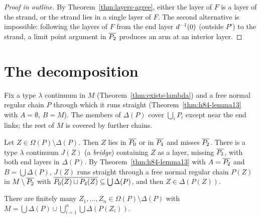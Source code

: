 \begin{proof}[Proof in outline]
By Theorem~\ref{thm:layers-agree}, either the layer of $F$ is a layer of the strand, or the strand lies in a single layer of
$F$. The second alternative is impossible: following the layers of $F$ from the end layer $d^{-1}(0)$ (outside $P'$) to the
strand, a limit point argument in $\overline{P_2}$ produces an arm at an interior layer.
\end{proof}


\section{The decomposition}

Fix a type $\lambda$ continuum in $M$ (Theorem~\ref{thm:exists-lambda}) and a free normal regular chain $P$ through which it runs
straight (Theorem~\ref{thm:h84-lemma13} with $A=\emptyset$, $B=M$). The members of $\Delta(P)$ cover $\bigcup_iP_i$ except near the
end links; the rest of $M$ is covered by further chains.

\begin{proposition}\label{prop:bridges}
Let $Z\in\Omega(P)\setminus\Delta(P)$. Then $Z$ lies in $\overline{P_0}$ or in $\overline{P_4}$ and misses $\overline{P_2}$. There is a type $\lambda$
continuum $J(Z)$ (a \emph{bridge}) containing $Z$ as a layer, missing $\overline{P_2}$, with both end layers in $\Delta(P)$. By
Theorem~\ref{thm:h84-lemma13} with $A=\overline{P_2}$ and $B=\bigcup\Delta(P)$, $J(Z)$ runs straight through a free normal regular chain
$P(Z)$ in $M\setminus\overline{P_2}$ with $\overline{P_0(Z)\cup P_4(Z)}\subseteq\bigcup\Delta(P)$, and then $Z\in\Delta(P(Z))$.
\end{proposition}


\begin{proposition}\label{prop:finite-cover}
There are finitely many $Z_1,\dots,Z_n\in\Omega(P)\setminus\Delta(P)$ with
$M=\bigcup\Delta(P)\cup\bigcup_{i=1}^n\bigcup\Delta(P(Z_i))$.
\end{proposition}

